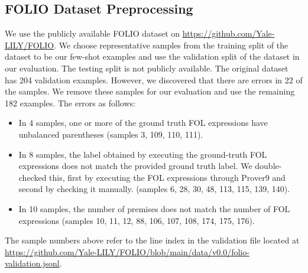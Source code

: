 \subsection{FOLIO Dataset Preprocessing}
\label{appendix_folio_dataset}
We use the publicly available FOLIO dataset on \url{https://github.com/Yale-LILY/FOLIO}. We choose representative samples from the training split of the dataset to be our few-shot examples and use the validation split of the dataset in our evaluation. The testing split is not publicly available. 
The original dataset has 204 validation examples. However, we discovered that there are errors in 22 of the samples. We remove these samples for our evaluation and use the remaining 182 examples. The errors as follows:
\begin{itemize}
    \item In 4 samples, one or more of the ground truth FOL expressions have unbalanced parentheses (samples 3, 109, 110, 111).
    \item In 8 samples, the label obtained by executing the ground-truth FOL expressions does not match the provided ground truth label. We double-checked this, first by executing the FOL expressions through Prover9 and second by checking it manually. (samples 6, 28, 30, 48, 113, 115, 139, 140). 
    \item In 10 samples, the number of premises does not match the number of FOL expressions (samples 10, 11, 12, 88, 106, 107, 108, 174, 175, 176).
\end{itemize}
The sample numbers above refer to the line index in the validation file located at \url{https://github.com/Yale-LILY/FOLIO/blob/main/data/v0.0/folio-validation.jsonl}.
